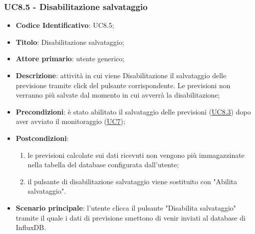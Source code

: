 	\subsubsection{UC8.5 - Disabilitazione salvataggio}
		\begin{itemize}
			\item\textbf{Codice Identificativo}: UC8.5;
			\item\textbf{Titolo}: Disabilitazione salvataggio;
			\item\textbf{Attore primario}: utente generico;
			\item\textbf{Descrizione}: attività in cui viene Disabilitazione il salvataggio delle previsione tramite click del pulsante corrispondente. Le previsioni non verranno più salvate dal momento in cui avverrà la disabilitazione;
			\item\textbf{Precondizioni}: è stato abilitato il salvataggio delle previsioni (\hyperref[par:UC8.3]{UC8.3}) dopo aver avviato il monitoraggio (\hyperref[par:UC7]{UC7});
			\item\textbf{Postcondizioni}: 
			\begin{enumerate}
			\item le previsioni calcolate sui dati ricevuti non vengono più immagazzinate nella tabella del database configurata dall'utente;
			\item il pulsante di disabilitazione salvataggio viene sostituito con "Abilita salvataggio".
			\end{enumerate}
			\item\textbf{Scenario principale}: l'utente clicca il pulsante "Disabilita salvataggio" tramite il quale i dati di previsione smettono di venir inviati al database di InfluxDB.		
		\end{itemize}	

\label{par:UC8.6}
